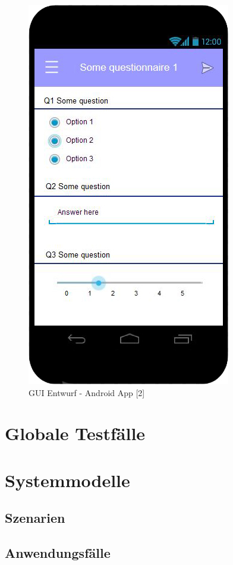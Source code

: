 \documentclass[a4paper]{scrreprt}
\begin{document}
	\begin{figure}[ht]
            \centering
            \includegraphics[scale = 0.3]{android2.jpg}
            \caption{GUI Entwurf - Android App [2]}
        \end{figure}

    \chapter{Globale Testfälle}

    \chapter{Systemmodelle}

        \section{Szenarien}

        \section{Anwendungsf\"alle}
\end{document}

